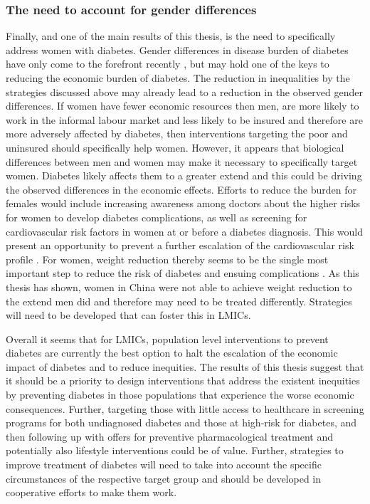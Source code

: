 \subsubsection{The need to account for gender differences}
Finally, and one of the main results of this thesis, is the need to specifically address women with diabetes. Gender differences in disease burden of diabetes have only come to the forefront recently \parencite{Peters2015}, but may hold one of the keys to reducing the economic burden of diabetes. The reduction in inequalities by the strategies discussed above may already lead to a reduction in the observed gender differences. If women have fewer economic resources then men, are more likely to work in the informal labour market and less likely to be insured \parencite{Galli2008} and therefore are more adversely affected by diabetes, then interventions targeting the poor and uninsured should specifically help women. However, it appears that biological differences between men and women may make it necessary to specifically target women. Diabetes likely affects them to a greater extend \parencite{Peters2015,Peters2014a,Peters2014,Bertram2010} and this could be driving the observed differences in the economic effects. Efforts to reduce the burden for females would include increasing awareness among doctors about the higher risks for women to develop diabetes complications, as well as screening for cardiovascular risk factors in women at or before a diabetes diagnosis. This would present an opportunity to prevent a further escalation of the cardiovascular risk profile \parencite{Peters2015}. For women, weight reduction thereby seems to be the single most important step to reduce the risk of diabetes and ensuing complications \parencite{Peters2015}. As this thesis has shown, women in China were not able to achieve weight reduction to the extend men did and therefore may need to be treated differently. Strategies will need to be developed that can foster this in \acp{LMIC}. 

Overall it seems that for \acp{LMIC}, population level interventions to prevent diabetes are currently the best option to halt the escalation of the economic impact of diabetes and to reduce inequities. The results of this thesis suggest that it should be a priority to design interventions that address the existent inequities by preventing diabetes in those populations that experience the worse economic consequences. Further, targeting those with little access to healthcare in screening programs for both undiagnosed diabetes and those at high-risk for diabetes, and then following up with offers for preventive pharmacological treatment and potentially also lifestyle interventions could be of value. Further, strategies to improve treatment of diabetes will need to take into account the specific circumstances of the respective target group and should be developed in cooperative efforts to make them work.



